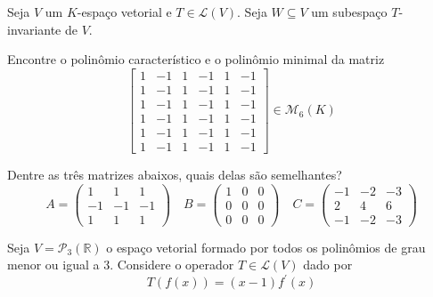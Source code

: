 \documentclass[11pt,a4paper]{article}
\begin{document}
\begin{exercicio}
 Seja $V$ um $K$-espaço vetorial e $T \in \mathcal{L}(V).$ Seja $W \subseteq V$ um subespaço $T$-invariante de $V.$
\end{exercicio}
\solucao{}
\begin{exercicio}
Encontre o polinômio característico e o polinômio minimal da matriz
\[
\begin{bmatrix}
1 & -1 & 1 & -1 & 1 & -1 \\
1 & -1 & 1 & -1 & 1 & -1 \\
1 & -1 & 1 & -1 & 1 & -1 \\
1 & -1 & 1 & -1 & 1 & -1 \\
1 & -1 & 1 & -1 & 1 & -1 \\
1 & -1 & 1 & -1 & 1 & -1
\end{bmatrix} \in \mathcal{M}_6(K)
\]
 
\end{exercicio}
\solucao{}
\begin{exercicio}
 Dentre as três matrizes abaixos, quais delas são semelhantes?
\[
A = \begin{pmatrix}
1 & 1 & 1 \\
-1& -1 & -1 \\
1 & 1 & 1
\end{pmatrix}  \quad B = \begin{pmatrix}
1 & 0 & 0 \\
0& 0 & 0 \\
0 & 0 &0
\end{pmatrix} \quad C = \begin{pmatrix}
-1 & -2 & -3 \\
2& 4 & 6 \\
-1& -2 &-3
\end{pmatrix}
\]
\end{exercicio}
\solucao{}
\begin{exercicio} Seja $V = \mathcal{P}_3(\mathbb{R})$ o espaço vetorial formado por todos os polinômios de grau menor ou igual a $3.$ Considere o operador $T \in \mathcal{L}(V)$ dado por
\[
T(f(x)) = (x-1) f^{\prime}(x)
\]
\end{exercicio}
\end{document}
